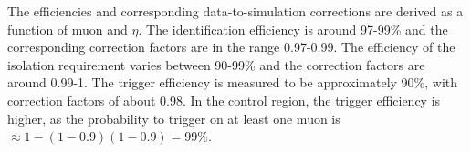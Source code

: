 The efficiencies and corresponding data-to-simulation corrections are derived 
as a function of muon \pt and $\eta$. The identification efficiency is around 
97-99\% and the corresponding correction factors are in the range 0.97-0.99. 
The efficiency 
of the isolation requirement varies between 90-99\% and the correction factors 
are around 0.99-1. The trigger efficiency is measured to be approximately 90\%, 
with correction factors of about 0.98. 
In the \mmj control region, the trigger efficiency is higher, as the 
probability to trigger on at least one muon is $\approx 1-(1-0.9)(1-0.9) = 
99\%$.


